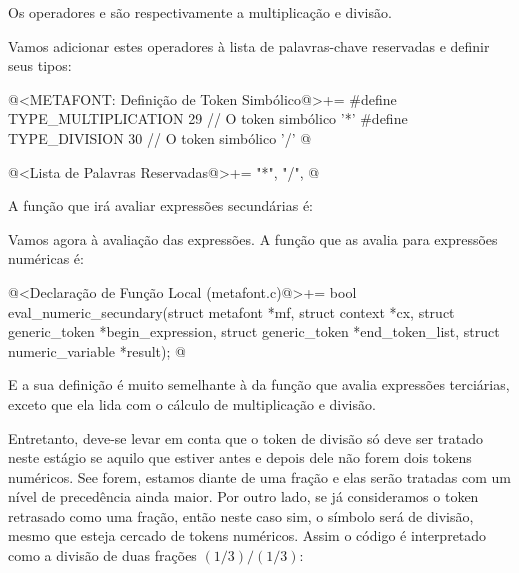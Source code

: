 Os operadores \monoespaco{*} e \monoespaco{/} são respectivamente a
multiplicação e divisão.

Vamos adicionar estes operadores à lista de palavras-chave reservadas
e definir seus tipos:

\iniciocodigo
@<METAFONT: Definição de Token Simbólico@>+=
#define TYPE_MULTIPLICATION        29 // O token simbólico '*'
#define TYPE_DIVISION              30 // O token simbólico '/'
@
\fimcodigo

\iniciocodigo
@<Lista de Palavras Reservadas@>+=
"*", "/",
@
\fimcodigo

A função que irá avaliar expressões secundárias é:

Vamos agora à avaliação das expressões. A função que as avalia para
expressões numéricas é:

\iniciocodigo
@<Declaração de Função Local (metafont.c)@>+=
bool eval_numeric_secundary(struct metafont *mf, struct context *cx,
                            struct generic_token *begin_expression,
                            struct generic_token *end_token_list,
                            struct numeric_variable *result);
@
\fimcodigo

E a sua definição é muito semelhante à da função que avalia expressões
terciárias, exceto que ela lida com o cálculo de multiplicação e
divisão.

Entretanto, deve-se levar em conta que o token de divisão só deve ser
tratado neste estágio se aquilo que estiver antes e depois dele não
forem dois tokens numéricos. See forem, estamos diante de uma fração e
elas serão tratadas com um nível de precedência ainda maior. Por outro
lado, se já consideramos o token retrasado como uma fração, então
neste caso sim, o símbolo será de divisão, mesmo que esteja cercado de
tokens numéricos. Assim o código  é interpretado
como a divisão de duas frações $(1/3)/(1/3)$:



